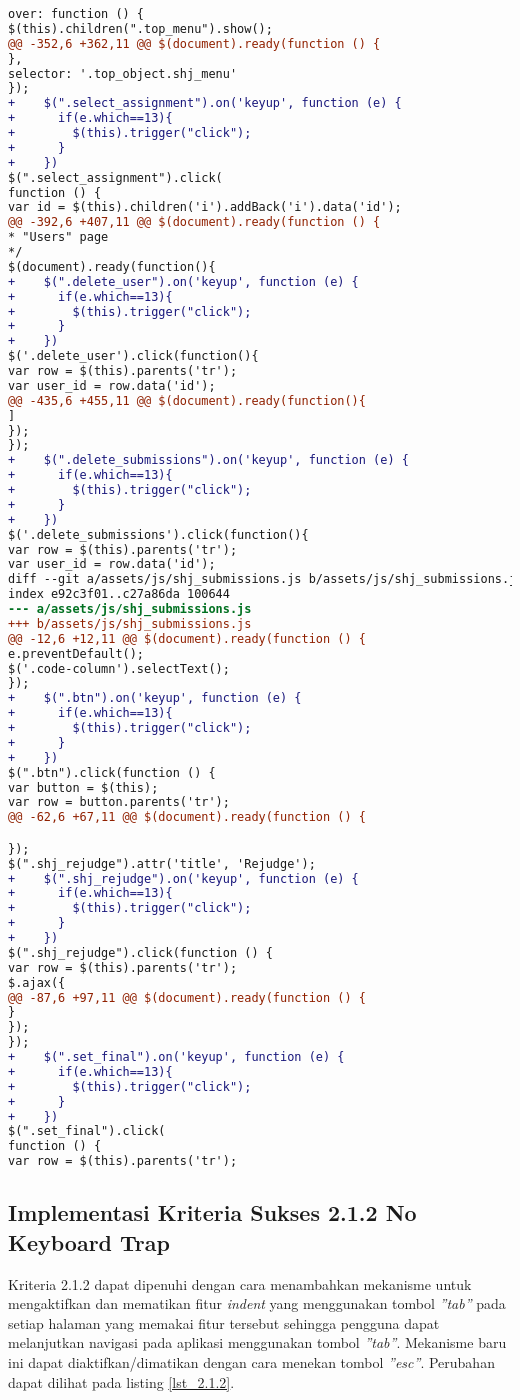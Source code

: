 \begin{itemize}
\begin{lstlisting}[language=diff, caption=Perubahan untuk mematuhi kriteria 2.1.1, label=lst_2.1.1, basicstyle=\ttfamily, frame=single,
columns=fullflexible, keepspaces=true, breaklines=true]
over: function () {
$(this).children(".top_menu").show();
@@ -352,6 +362,11 @@ $(document).ready(function () {
},
selector: '.top_object.shj_menu'
});
+    $(".select_assignment").on('keyup', function (e) {
+      if(e.which==13){
+        $(this).trigger("click");
+      }
+    })
$(".select_assignment").click(
function () {
var id = $(this).children('i').addBack('i').data('id');
@@ -392,6 +407,11 @@ $(document).ready(function () {
* "Users" page
*/
$(document).ready(function(){
+    $(".delete_user").on('keyup', function (e) {
+      if(e.which==13){
+        $(this).trigger("click");
+      }
+    })
$('.delete_user').click(function(){
var row = $(this).parents('tr');
var user_id = row.data('id');
@@ -435,6 +455,11 @@ $(document).ready(function(){
]
});
});
+    $(".delete_submissions").on('keyup', function (e) {
+      if(e.which==13){
+        $(this).trigger("click");
+      }
+    })
$('.delete_submissions').click(function(){
var row = $(this).parents('tr');
var user_id = row.data('id');
diff --git a/assets/js/shj_submissions.js b/assets/js/shj_submissions.js
index e92c3f01..c27a86da 100644
--- a/assets/js/shj_submissions.js
+++ b/assets/js/shj_submissions.js
@@ -12,6 +12,11 @@ $(document).ready(function () {
e.preventDefault();
$('.code-column').selectText();
});
+    $(".btn").on('keyup', function (e) {
+      if(e.which==13){
+        $(this).trigger("click");
+      }
+    })
$(".btn").click(function () {
var button = $(this);
var row = button.parents('tr');
@@ -62,6 +67,11 @@ $(document).ready(function () {

});
$(".shj_rejudge").attr('title', 'Rejudge');
+    $(".shj_rejudge").on('keyup', function (e) {
+      if(e.which==13){
+        $(this).trigger("click");
+      }
+    })
$(".shj_rejudge").click(function () {
var row = $(this).parents('tr');
$.ajax({
@@ -87,6 +97,11 @@ $(document).ready(function () {
}
});
});
+    $(".set_final").on('keyup', function (e) {
+      if(e.which==13){
+        $(this).trigger("click");
+      }
+    })
$(".set_final").click(
function () {
var row = $(this).parents('tr');
\end{lstlisting}

\end{itemize}

\subsection{Implementasi Kriteria Sukses 2.1.2 No Keyboard Trap}
\label{subsec:implementasi_A_2.1.2}

Kriteria 2.1.2 dapat dipenuhi dengan cara menambahkan mekanisme untuk mengaktifkan dan mematikan fitur \textit{indent} yang menggunakan tombol \textit{''tab''} pada setiap halaman yang memakai fitur tersebut sehingga pengguna dapat melanjutkan navigasi pada aplikasi menggunakan tombol \textit{''tab''}. Mekanisme baru ini dapat diaktifkan/dimatikan dengan cara menekan tombol \textit{''esc''}. Perubahan dapat dilihat pada listing \ref{lst_2.1.2}.

